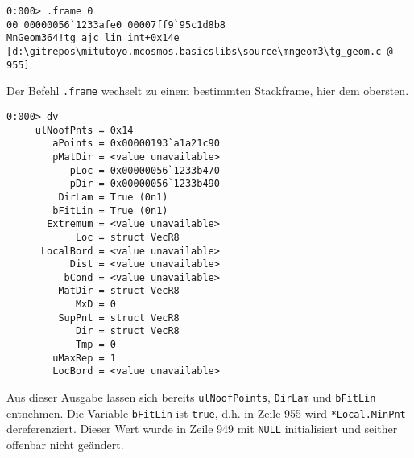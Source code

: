 \begin{lstlisting}
0:000> .frame 0
00 00000056`1233afe0 00007ff9`95c1d8b8     MnGeom364!tg_ajc_lin_int+0x14e [d:\gitrepos\mitutoyo.mcosmos.basicslibs\source\mngeom3\tg_geom.c @ 955] 
\end{lstlisting}

Der Befehl \verb|.frame| wechselt zu einem bestimmten Stackframe, hier dem obersten.

\begin{lstlisting}
0:000> dv
     ulNoofPnts = 0x14
        aPoints = 0x00000193`a1a21c90
        pMatDir = <value unavailable>
           pLoc = 0x00000056`1233b470
           pDir = 0x00000056`1233b490
         DirLam = True (0n1)
        bFitLin = True (0n1)
       Extremum = <value unavailable>
            Loc = struct VecR8
      LocalBord = <value unavailable>
           Dist = <value unavailable>
          bCond = <value unavailable>
         MatDir = struct VecR8
            MxD = 0
         SupPnt = struct VecR8
            Dir = struct VecR8
            Tmp = 0
        uMaxRep = 1
        LocBord = <value unavailable>
\end{lstlisting}

Aus dieser Ausgabe lassen sich bereits \verb|ulNoofPoints|, \verb|DirLam| und \verb|bFitLin| entnehmen.
Die Variable \verb|bFitLin| ist \verb|true|, d.h. in Zeile 955 wird \verb|*Local.MinPnt| dereferenziert. Dieser Wert wurde in Zeile 949 mit \verb|NULL| initialisiert und seither offenbar nicht geändert.

